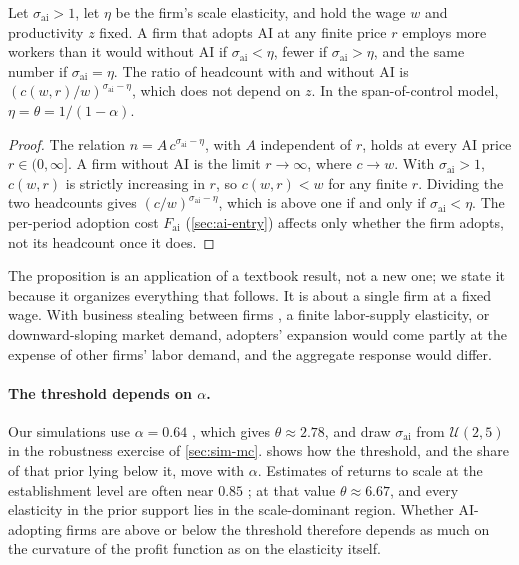 \begin{proposition}\label{prop:threshold}
Let $\sigma_{\text{ai}} > 1$, let $\eta$ be the firm's scale elasticity, and hold the wage $w$ and productivity $z$ fixed.
A firm that adopts AI at any finite price $r$ employs more workers than it would without AI if $\sigma_{\text{ai}} < \eta$, fewer if $\sigma_{\text{ai}} > \eta$, and the same number if $\sigma_{\text{ai}} = \eta$.
The ratio of headcount with and without AI is $(c(w,r)/w)^{\sigma_{\text{ai}} - \eta}$, which does not depend on $z$.
In the span-of-control model, $\eta = \theta = 1/(1-\alpha)$.
\end{proposition}

\begin{proof}
The relation $n = A\, c^{\sigma_{\text{ai}} - \eta}$, with $A$ independent of $r$, holds at every AI price $r \in (0, \infty]$.
A firm without AI is the limit $r \to \infty$, where $c \to w$.
With $\sigma_{\text{ai}} > 1$, $c(w,r)$ is strictly increasing in $r$, so $c(w, r) < w$ for any finite $r$.
Dividing the two headcounts gives $(c/w)^{\sigma_{\text{ai}} - \eta}$, which is above one if and only if $\sigma_{\text{ai}} < \eta$.
The per-period adoption cost $F_{\text{ai}}$ (\cref{sec:ai-entry}) affects only whether the firm adopts, not its headcount once it does.
\end{proof}

\noindent
The proposition is an application of a textbook result, not a new one; we state it because it organizes everything that follows.
It is about a single firm at a fixed wage.
With business stealing between firms \citep{acemoglu2020competing,koch2021robots}, a finite labor-supply elasticity, or downward-sloping market demand, adopters' expansion would come partly at the expense of other firms' labor demand, and the aggregate response would differ.

\paragraph{The threshold depends on $\alpha$.}
Our simulations use $\alpha = 0.64$ \citep{hopenhayn1993job}, which gives $\theta \approx 2.78$, and draw $\sigma_{\text{ai}}$ from $\mathcal{U}(2,5)$ in the robustness exercise of \cref{sec:sim-mc}.
 shows how the threshold, and the share of that prior lying below it, move with $\alpha$.
Estimates of returns to scale at the establishment level are often near $0.85$ \citep{atkeson2005modeling,restuccia2008policy}; at that value $\theta \approx 6.67$, and every elasticity in the prior support lies in the scale-dominant region.
Whether AI-adopting firms are above or below the threshold therefore depends as much on the curvature of the profit function as on the elasticity itself.

